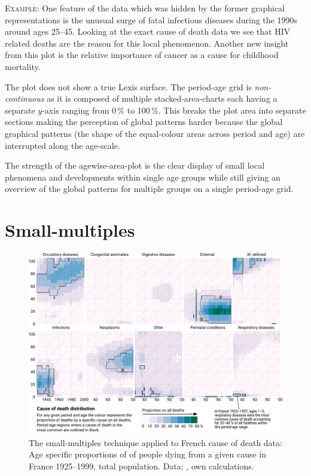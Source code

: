 \documentclass[parskip=half]{scrartcl}
\begin{document}
\textsc{Example:} One feature of the data which was hidden by the former graphical representations is the unusual surge of fatal infectious diseases during the 1990s around ages 25--45. Looking at the exact cause of death data we see that HIV related deaths are the reason for this local phenomenon. Another new insight from this plot is the relative importance of cancer as a cause for childhood mortality.

The plot does not show a true Lexis surface. The period-age grid is \emph{non-continuous} as it is composed of multiple stacked-area-charts each having a separate $y$-axis ranging from 0\,\% to 100\,\%. This breaks the plot area into separate sections making the perception of global patterns harder because the global graphical patterns (the shape of the equal-colour areas across period and age) are interrupted along the age-scale.

The strength of the agewise-area-plot is the clear display of small local phenomena and developments within single age groups while still giving an overview of the global patterns for multiple groups on a single period-age grid.

\clearpage

\section{Small-multiples} %
\label{sec:sm}

\begin{figure}
  \centering
  \includegraphics[width = \linewidth]{./fig/small_multiples.pdf}
  \caption{The small-multiples technique applied to French cause of death data: Age specific proportions of of people dying from a given cause in France 1925--1999, total population. Data: \cite{Vallin2014}, own calculations.}
  \label{fig:smg}
\end{figure}
\end{document}
